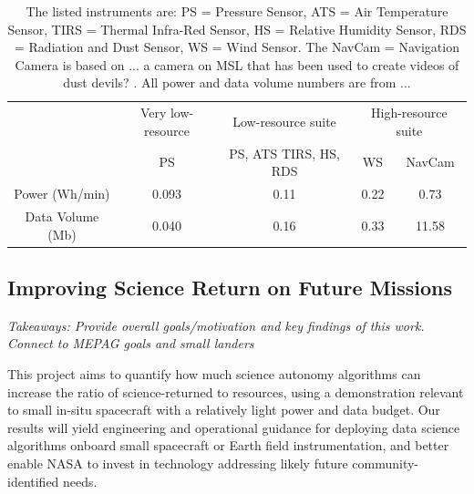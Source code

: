 \begin{table}[]
    \centering
    \begin{tabular}{c|c|c|c|c|}
        {} & {Very low-resource} & {Low-resource suite} & \multicolumn{2}{|c|}{High-resource suite} \\
        {} & PS & {PS, ATS TIRS, HS, RDS} & WS & NavCam  \\ \hline
        Power (Wh/min) & 0.093 & 0.11 & 0.22 & 0.73  \\ \hline 
        Data Volume (Mb) & 0.040 & 0.16 & 0.33 & 11.58  \\ \hline
    \end{tabular}
    \caption{The listed instruments are: PS = Pressure Sensor, ATS = Air Temperature Sensor, TIRS = Thermal Infra-Red Sensor, HS = Relative Humidity Sensor, RDS = Radiation and Dust Sensor, WS = Wind Sensor. The NavCam = Navigation Camera is based on ... a camera on MSL that has been used to create videos of dust devils? \cite{}. All power and data volume numbers are from ... }
    \label{tab:PayloadModes}
\end{table}


\subsection{Improving Science Return on Future Missions}
\textit{Takeaways: Provide overall goals/motivation and key findings of this work. Connect to MEPAG goals and small landers}

This project aims to quantify how much science autonomy algorithms can increase the ratio of science-returned to resources, using a demonstration relevant to small in-situ spacecraft with a relatively light power and data budget. 
Our results will yield engineering and operational guidance for deploying data science algorithms onboard small spacecraft or Earth field instrumentation, and better enable NASA to invest in technology addressing likely future community-identified needs.

